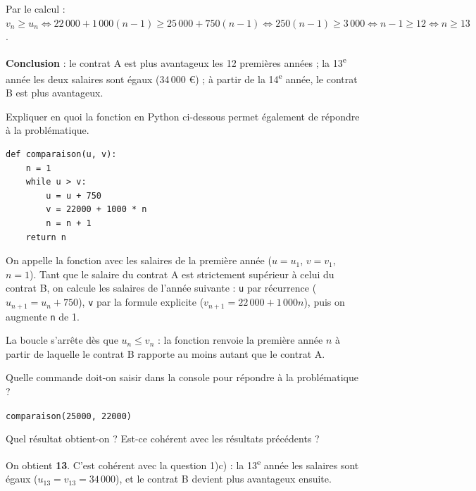 \documentclass[12pt,a4paper]{book}
\begin{document}
\begin{enumMet}
\begin{enumMet}
\begin{corrBox}
			Par le calcul : $v_n\geqslant u_n \iff 22\,000+1\,000(n-1)\geqslant 25\,000+750(n-1) \iff 250(n-1)\geqslant 3\,000 \iff n-1\geqslant 12 \iff n\geqslant 13$.

			\textbf{Conclusion} : le contrat A est plus avantageux les 12 premières années ; la 13\textsuperscript{e} année les deux salaires sont égaux (34\,000 \euro) ; à partir de la 14\textsuperscript{e} année, le contrat B est plus avantageux.
		\end{corrBox}
	\end{enumMet}
	\item \begin{enumMet}
		\item Expliquer en quoi la fonction en Python ci-dessous permet également de répondre à la problématique.

\begin{center}
\begin{minipage}{0.65\linewidth}
\begin{verbatim}
def comparaison(u, v):
    n = 1
    while u > v:
        u = u + 750
        v = 22000 + 1000 * n
        n = n + 1
    return n
\end{verbatim}
\end{minipage}
\end{center}

		\begin{corrBox}
			On appelle la fonction avec les salaires de la première année ($u=u_1$, $v=v_1$, $n=1$). Tant que le salaire du contrat A est strictement supérieur à celui du contrat B, on calcule les salaires de l'année suivante : \texttt{u} par récurrence ($u_{n+1}=u_n+750$), \texttt{v} par la formule explicite ($v_{n+1}=22\,000+1\,000n$), puis on augmente \texttt{n} de 1.

			La boucle s'arrête dès que $u_n\leqslant v_n$ : la fonction renvoie la première année $n$ à partir de laquelle le contrat B rapporte au moins autant que le contrat A.
		\end{corrBox}
		\item Quelle commande doit-on saisir dans la console pour répondre à la problématique ?

		\begin{corrBox}
			\texttt{comparaison(25000, 22000)}
		\end{corrBox}
		\item Quel résultat obtient-on ? Est-ce cohérent avec les résultats précédents ?

		\begin{corrBox}
			On obtient \textbf{13}. C'est cohérent avec la question 1)c) : la 13\textsuperscript{e} année les salaires sont égaux ($u_{13}=v_{13}=34\,000$), et le contrat B devient plus avantageux ensuite.
		\end{corrBox}
	\end{enumMet}
\end{enumMet}
\end{document}
